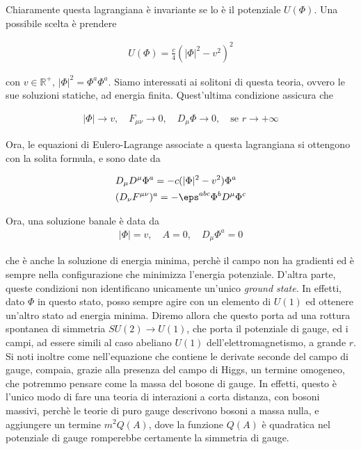 \documentclass{report}
\begin{document}
Chiaramente questa lagrangiana è invariante se lo è il potenziale \(U(\Phi)\). Una possibile scelta è prendere 

\begin{align}
    U(\Phi) = \frac{c}{4}(|\Phi|^2 - v^2)^2
\end{align}

con  \(v \in \mathbb{R}^+, \, |\Phi|^2 = \Phi^a\Phi^a\). Siamo interessati ai solitoni di questa teoria, ovvero le sue soluzioni statiche, ad energia finita. Quest'ultima condizione assicura che 

\begin{align}
    |\Phi| \rightarrow v, \quad F_{\mu\nu} \rightarrow 0, \quad D_\mu \Phi \rightarrow 0, \quad \text{se } r \rightarrow +\infty
\end{align}

Ora, le equazioni di Eulero-Lagrange associate a questa lagrangiana si ottengono con la solita formula, e sono date da

\begin{align}
    &D_\mu D^\mu \Phi^a = -c(|\Phi|^2 - v^2)\Phi^a \\
    &(D_\nu F^{\mu\nu})^a = -\eps^{abc}\Phi^bD^\mu \Phi^c
\end{align}

Ora, una soluzione banale è data da 
\begin{align}
    |\Phi| = v, \quad A = 0, \quad D_\mu \Phi^a = 0
\end{align}

che è anche la soluzione di energia minima, perchè il campo non ha gradienti ed è sempre nella configurazione che minimizza l'energia potenziale. D'altra parte, queste condizioni non identificano unicamente un'unico \emph{ground state}. In effetti, dato \(\Phi\) in questo stato, posso sempre agire con un elemento di \(U(1)\) ed ottenere un'altro stato ad energia minima. Diremo allora che questo porta ad una rottura spontanea di simmetria \(SU(2)\rightarrow U(1)\), che porta il potenziale di gauge, ed i campi, ad essere simili al caso abeliano \(U(1)\) dell'elettromagnetismo, a grande \(r\). \\

Si noti inoltre come nell'equazione che contiene le derivate seconde del campo di gauge, compaia, grazie alla presenza del campo di Higgs, un termine omogeneo, che potremmo pensare come la massa del bosone di gauge. In effetti, questo è l'unico modo di fare una teoria di interazioni a corta distanza, con bosoni massivi, perchè le teorie di puro gauge descrivono bosoni a massa nulla, e aggiungere un termine \(m^2 Q(A)\), dove la funzione \(Q(A)\) è quadratica nel potenziale di gauge romperebbe certamente la simmetria di gauge.  
\end{document}
